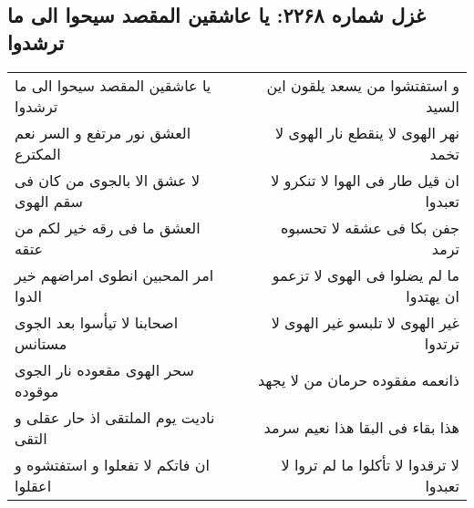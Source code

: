 \begin{center}
\section*{غزل شماره ۲۲۶۸: یا عاشقین المقصد سیحوا الی ما ترشدوا}
\label{sec:2268}
\begin{longtable}{l p{0.5cm} r}
یا عاشقین المقصد سیحوا الی ما ترشدوا
&&
و استفتشوا من یسعد یلقون این السید
\\
العشق نور مرتفع و السر نعم المکترع
&&
نهر الهوی لا ینقطع نار الهوی لا تخمد
\\
لا عشق الا بالجوی من کان فی سقم الهوی
&&
ان قیل طار فی الهوا لا تنکرو لا تعبدوا
\\
العشق ما فی رقه خیر لکم من عتقه
&&
جفن بکا فی عشقه لا تحسبوه ترمد
\\
امر المحبین انطوی امراضهم خیر الدوا
&&
ما لم یضلوا فی الهوی لا تزعمو ان یهتدوا
\\
اصحابنا لا تیأسوا بعد الجوی مستانس
&&
غیر الهوی لا تلبسو غیر الهوی لا ترتدوا
\\
سحر الهوی مقعوده نار الجوی موقوده
&&
ذانعمه مفقوده حرمان من لا یجهد
\\
نادیت یوم الملتقی اذ حار عقلی و التقی
&&
هذا بقاء فی البقا هذا نعیم سرمد
\\
ان فاتکم لا تفعلوا و استفتشوه و اعقلوا
&&
لا ترقدوا لا تأکلوا ما لم تروا لا تعبدوا
\\
\end{longtable}
\end{center}
